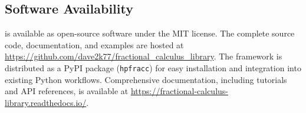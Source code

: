 \subsection{Software Availability}

\hpfracc is available as open-source software under the MIT license. The complete source code, documentation, and examples are hosted at \url{https://github.com/dave2k77/fractional_calculus_library}. The framework is distributed as a PyPI package (\texttt{hpfracc}) for easy installation and integration into existing Python workflows. Comprehensive documentation, including tutorials and API references, is available at \url{https://fractional-calculus-library.readthedocs.io/}.
